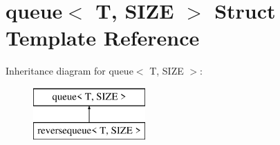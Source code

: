 \hypertarget{structqueue}{}\section{queue$<$ T, S\+I\+ZE $>$ Struct Template Reference}
\label{structqueue}
Inheritance diagram for queue$<$ T, S\+I\+ZE $>$\+:\begin{figure}[H]
\begin{center}
\leavevmode
\includegraphics[height=2.000000cm]{structqueue}
\end{center}
\end{figure}
